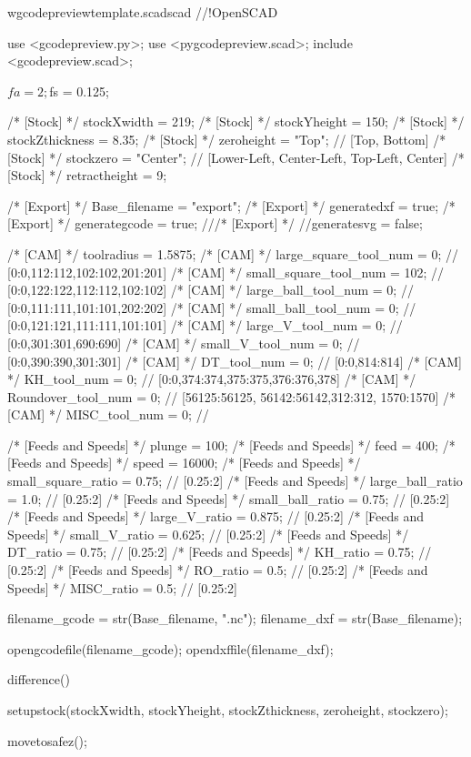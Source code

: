 \documentclass{ltxdoc}
\begin{document}
\begin{writecode}{w}{gcodepreviewtemplate.scad}{scad}
//!OpenSCAD

use <gcodepreview.py>;
use <pygcodepreview.scad>;
include <gcodepreview.scad>;

$fa = 2;
$fs = 0.125;

/* [Stock] */
stockXwidth = 219;
/* [Stock] */
stockYheight = 150;
/* [Stock] */
stockZthickness = 8.35;
/* [Stock] */
zeroheight = "Top"; // [Top, Bottom]
/* [Stock] */
stockzero = "Center"; // [Lower-Left, Center-Left, Top-Left, Center]
/* [Stock] */
retractheight = 9;

/* [Export] */
Base_filename = "export"; 
/* [Export] */
generatedxf = true; 
/* [Export] */
generategcode = true; 
///* [Export] */
//generatesvg = false; 

/* [CAM] */
toolradius = 1.5875;
/* [CAM] */
large_square_tool_num = 0; // [0:0,112:112,102:102,201:201]
/* [CAM] */
small_square_tool_num = 102; // [0:0,122:122,112:112,102:102]
/* [CAM] */
large_ball_tool_num = 0; // [0:0,111:111,101:101,202:202]
/* [CAM] */
small_ball_tool_num = 0; // [0:0,121:121,111:111,101:101]
/* [CAM] */
large_V_tool_num = 0; // [0:0,301:301,690:690]
/* [CAM] */
small_V_tool_num = 0; // [0:0,390:390,301:301]
/* [CAM] */
DT_tool_num = 0; // [0:0,814:814]
/* [CAM] */
KH_tool_num = 0; // [0:0,374:374,375:375,376:376,378]
/* [CAM] */
Roundover_tool_num = 0; // [56125:56125, 56142:56142,312:312, 1570:1570]
/* [CAM] */
MISC_tool_num = 0; // 

/* [Feeds and Speeds] */
plunge = 100;
/* [Feeds and Speeds] */
feed = 400;
/* [Feeds and Speeds] */
speed = 16000;
/* [Feeds and Speeds] */
small_square_ratio = 0.75; // [0.25:2]
/* [Feeds and Speeds] */
large_ball_ratio = 1.0; // [0.25:2]
/* [Feeds and Speeds] */
small_ball_ratio = 0.75; // [0.25:2]
/* [Feeds and Speeds] */
large_V_ratio = 0.875; // [0.25:2]
/* [Feeds and Speeds] */
small_V_ratio = 0.625; // [0.25:2]
/* [Feeds and Speeds] */
DT_ratio = 0.75; // [0.25:2]
/* [Feeds and Speeds] */
KH_ratio = 0.75; // [0.25:2]
/* [Feeds and Speeds] */
RO_ratio = 0.5; // [0.25:2]
/* [Feeds and Speeds] */
MISC_ratio = 0.5; // [0.25:2]

filename_gcode = str(Base_filename, ".nc");
filename_dxf = str(Base_filename);

opengcodefile(filename_gcode);
opendxffile(filename_dxf);

difference() {
setupstock(stockXwidth, stockYheight, stockZthickness, zeroheight, stockzero);

movetosafez();

}
\end{writecode}
\end{document}
